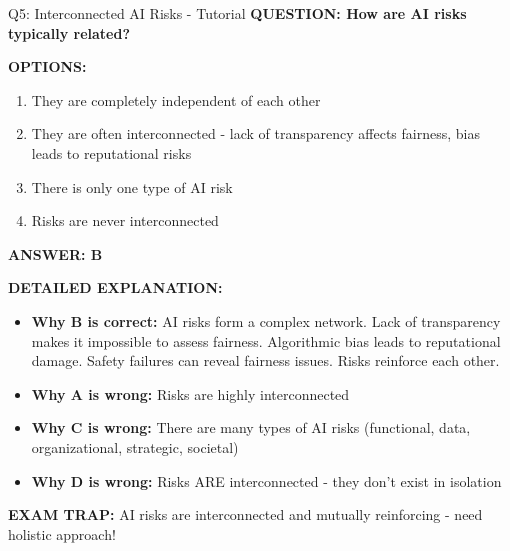 \documentclass[8pt]{beamer}
\begin{document}
	\begin{frame}{Q5: Interconnected AI Risks - Tutorial}
		\fontsize{6.5}{7.5}\selectfont
		\textbf{QUESTION: How are AI risks typically related?}
		
		\vspace{0.1cm}
		\textbf{OPTIONS:}
		\begin{enumerate}
			\item They are completely independent of each other
			\item They are often interconnected - lack of transparency affects fairness, bias leads to reputational risks
			\item There is only one type of AI risk
			\item Risks are never interconnected
		\end{enumerate}
		
		\vspace{0.1cm}
		\textcolor{myblue}{\textbf{ANSWER: B}}
		
		\vspace{0.1cm}
		\textbf{DETAILED EXPLANATION:}
		\begin{itemize}
			\item \textbf{Why B is correct:} AI risks form a complex network. Lack of transparency makes it impossible to assess fairness. Algorithmic bias leads to reputational damage. Safety failures can reveal fairness issues. Risks reinforce each other.
			\item \textbf{Why A is wrong:} Risks are highly interconnected
			\item \textbf{Why C is wrong:} There are many types of AI risks (functional, data, organizational, strategic, societal)
			\item \textbf{Why D is wrong:} Risks ARE interconnected - they don't exist in isolation
		\end{itemize}
		
		\textcolor{myred}{\textbf{EXAM TRAP:}} AI risks are \textcolor{myblue}{interconnected and mutually reinforcing} - need holistic approach!
	\end{frame}
	
	
\end{document}
